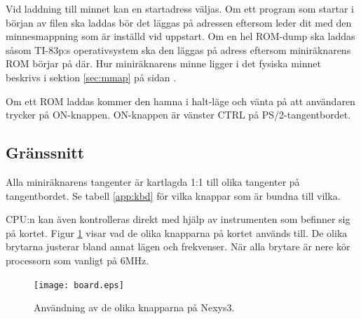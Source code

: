 \documentclass[main.tex]{subfiles}
\begin{document}
Vid laddning till minnet kan en startadress väljas. Om ett program som startar
i början av filen ska laddas bör det läggas på adressen  eftersom
 leder dit med den minnesmappning som är inställd vid uppstart. Om
en hel ROM-dump ska laddas såsom TI-83p:s operativsystem ska den läggas på
adress  eftersom miniräknarens ROM börjar på där. Hur miniräknarens
minne ligger i det fysiska minnet beskrivs i sektion \ref{sec:mmap} på sidan
\pageref{sec:mmap}.

Om ett ROM laddas kommer den hamna i halt-läge och vänta på att användaren
trycker på ON-knappen. ON-knappen är vänster CTRL på PS/2-tangentbordet.

\subsection{Gränssnitt}
Alla miniräknarens tangenter är kartlagda 1:1 till olika tangenter på
tangentbordet. Se tabell \ref{app:kbd} för vilka knappar som är bundna till
vilka.

CPU:n kan även kontrolleras direkt med hjälp av instrumenten som befinner sig
på kortet. Figur \ref{fig:interface} visar vad de olika knapparna på kortet
används till. De olika brytarna justerar bland annat lägen och frekvenser. När
alla brytare är nere kör processorn som vanligt på 6MHz.

\begin{figure}[b]
    \centering
    \texttt{[image: board.eps]}
    \caption{Användning av de olika knapparna på Nexys3.}
    \label{fig:interface}
\end{figure}
\end{document}
